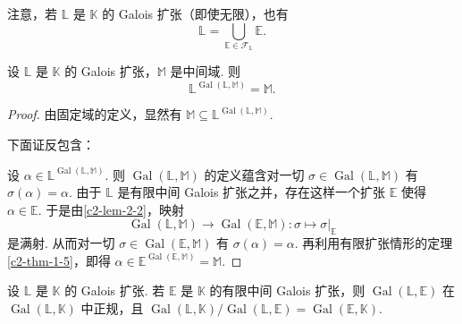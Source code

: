 \begin{remark}\label{c2-rem-2-2}
注意，若 $\mathbb{L}$ 是 $\mathbb{K}$ 的 Galois 扩张（即使无限），也有
\[
\mathbb{L}=\bigcup_{\mathbb{E}\in\mathcal{F}_{\mathbb{L}}}\mathbb{E}.
\]
\end{remark}

\begin{lemma}\label{c2-lem-2-3}
设 $\mathbb{L}$ 是 $\mathbb{K}$ 的 Galois 扩张，$\mathbb{M}$ 是中间域. 则
\[
\mathbb{L}^{\operatorname{Gal}(\mathbb{L},\mathbb{M})}=\mathbb{M}.
\]
\end{lemma}

\begin{proof}
由固定域的定义，显然有 $\mathbb{M}\subseteq\mathbb{L}^{\operatorname{Gal}(\mathbb{L},\mathbb{M})}$.

下面证反包含：

设 $\alpha\in\mathbb{L}^{\operatorname{Gal}(\mathbb{L},\mathbb{M})}$. 则 $\operatorname{Gal}(\mathbb{L},\mathbb{M})$ 的定义蕴含对一切 $\sigma\in\operatorname{Gal}(\mathbb{L},\mathbb{M})$ 有 $\sigma(\alpha)=\alpha$. 由于 $\mathbb{L}$ 是有限中间 Galois 扩张之并，存在这样一个扩张 $\mathbb{E}$ 使得 $\alpha\in\mathbb{E}$. 于是由\autoref{c2-lem-2-2}，映射
\[
\operatorname{Gal}(\mathbb{L},\mathbb{M})\to\operatorname{Gal}(\mathbb{E},\mathbb{M}):\sigma\mapsto\sigma|_{\mathbb{E}}
\]
是满射. 从而对一切 $\sigma\in\operatorname{Gal}(\mathbb{E},\mathbb{M})$ 有 $\sigma(\alpha)=\alpha$. 再利用有限扩张情形的定理\autoref{c2-thm-1-5}，即得 $\alpha\in\mathbb{E}^{\operatorname{Gal}(\mathbb{E},\mathbb{M})}=\mathbb{M}$.
\end{proof}

\begin{proposition}\label{c2-prop-2-4}
设 $\mathbb{L}$ 是 $\mathbb{K}$ 的 Galois 扩张. 若 $\mathbb{E}$ 是 $\mathbb{K}$ 的有限中间 Galois 扩张，则 $\operatorname{Gal}(\mathbb{L},\mathbb{E})$ 在 $\operatorname{Gal}(\mathbb{L},\mathbb{K})$ 中正规，且 $\operatorname{Gal}(\mathbb{L},\mathbb{K})/\operatorname{Gal}(\mathbb{L},\mathbb{E})=\operatorname{Gal}(\mathbb{E},\mathbb{K})$.
\end{proposition}

